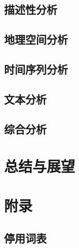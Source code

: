 \documentclass[UTF8]{ctexart}
\begin{document}
\subsection{描述性分析}


\subsection{地理空间分析}


\subsection{时间序列分析}


\subsection{文本分析}


\subsection{综合分析}

\pagebreak

\section{总结与展望}


\appendix
\section{附录}

\subsection{停用词表} \label{sec:停用词表}
\end{document}
